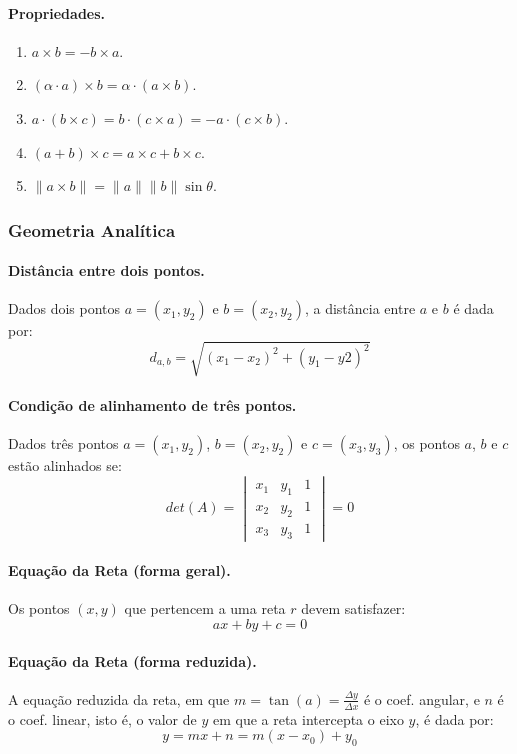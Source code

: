 \paragraph{Propriedades.}
\begin{enumerate}
	\item $a \times b = -b \times a$.
	\item $(\alpha \cdot a) \times b = \alpha \cdot (a \times b)$.
	\item $a \cdot (b \times c) = b\cdot (c \times a) = -a\cdot(c\times b)$.
	\item $(a+b)\times c = a\times c + b\times c$.
	\item $\|a \times b \| = \|a\|\|b\|\sin\theta$.
\end{enumerate}

\subsubsection{Geometria Analítica}
\paragraph{Distância entre dois pontos.} Dados dois pontos $a = (x_1,y_2)$ e $b = (x_2,y_2)$, a distância entre $a$ e $b$ é dada por:
		$$d_{a,b} = \sqrt{(x_1 - x_2)^2 + (y_1 - y2)^2}$$

\paragraph{Condição de alinhamento de três pontos.} Dados três pontos $a = (x_1,y_2)$, $b = (x_2,y_2)$ e $c = (x_3,y_3)$, os pontos $a$, $b$ e $c$ estão alinhados se:
		$$det(A) =
			\begin{vmatrix}
				x_1 & y_1 & 1 \\
				x_2 & y_2 & 1 \\
				x_3 & y_3 & 1
			\end{vmatrix} = 0 $$

\paragraph{Equação da Reta (forma geral).} Os pontos $(x,y)$ que pertencem a uma reta $r$ devem satisfazer:
		$$ax + by + c = 0$$

\paragraph{Equação da Reta (forma reduzida).} A equação reduzida da reta, em que $m = \tan(a) = \frac{\Delta y}{\Delta x}$ é o coef. angular, e $n$ é o coef. linear, isto é, o valor de $y$ em que a reta intercepta o eixo $y$, é dada por:
		$$y = mx + n = m(x - x_0) +y_0$$

